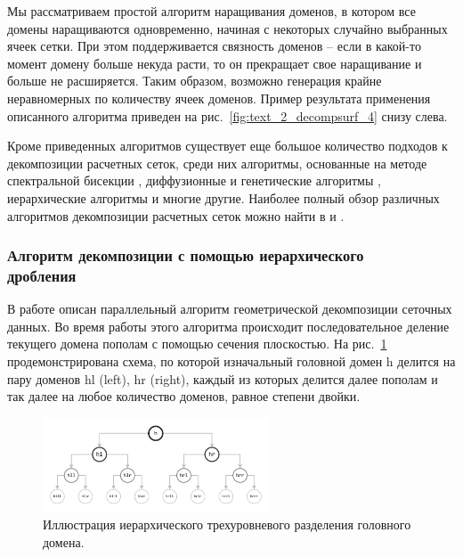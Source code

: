 Мы рассматриваем простой алгоритм наращивания доменов, в котором все домены наращиваются одновременно, начиная с некоторых случайно выбранных ячеек сетки.
При этом поддерживается связность доменов -- если в какой-то момент домену больше некуда расти, то он прекращает свое наращивание и больше не расширяется.
Таким образом, возможно генерация крайне неравномерных по количеству ячеек доменов. Пример результата применения описанного алгоритма приведен на рис.~\ref{fig:text_2_decompsurf_4} снизу слева.

Кроме приведенных алгоритмов существует еще большое количество подходов к декомпозиции расчетных сеток, среди них алгоритмы, основанные на методе спектральной бисекции \cite{Urschel2014Decomp}, диффузионные и генетические алгоритмы \cite{Zhao2019Decomp}, иерархические алгоритмы \cite{Kapyris1998Decomp} и многие другие.
Наиболее полный обзор различных алгоритмов декомпозиции расчетных сеток можно найти в \cite{Golovchenko2020Decomp} и \cite{Zheleznyakova2017Decomp}.

\subsubsection{Алгоритм декомпозиции с помощью иерархического \\ дробления}\label{sec:text_2_decompsurf_hierarchical}

\label{term:alg_decomp_inc}В работе \cite{Golovchenko2020Decomp} описан параллельный алгоритм геометрической декомпозиции сеточных данных.
Во время работы этого алгоритма происходит последовательное деление текущего домена пополам с помощью сечения плоскостью.
На рис.~\ref{fig:text_2_decompsurf_hierarchical} продемонстрирована схема, по которой изначальный головной домен h делится на пару доменов hl (left), hr (right), каждый из которых делится далее пополам и так далее на любое количество доменов, равное степени двойки.

\begin{figure}[ht]
\centering
\includegraphics[width=0.6\textwidth]{./pics/text_2_decompsurf/hierarchical.pdf}
\singlespacing
{}\caption{Иллюстрация иерархического трехуровневого разделения головного домена.}
\label{fig:text_2_decompsurf_hierarchical}
\end{figure}

